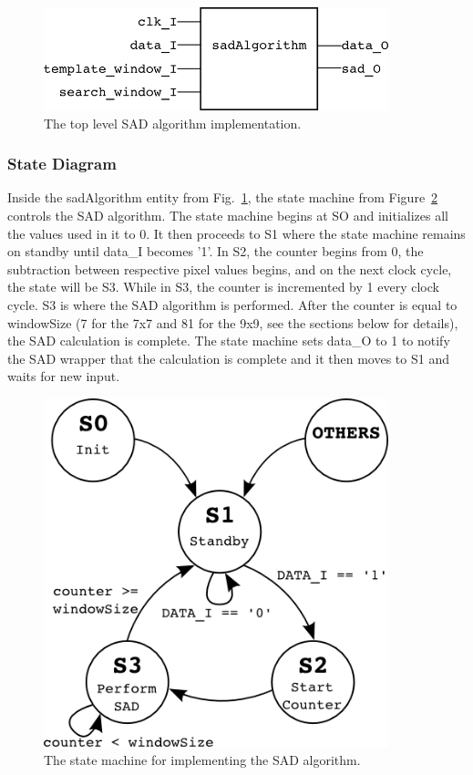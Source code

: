 \begin{figure}[h]
	\begin{center}
		\includegraphics[width=100mm]{figures/sadAlgorithm_rtl.png}
		\captionfonts
		\caption{The top level SAD algorithm implementation.}
		\label{fig:sadAlg_rtl}
	\end{center}
\end{figure}


\subsubsection{State Diagram}

Inside the sadAlgorithm entity from Fig.~\ref{fig:sadAlg_rtl}, the state machine from Figure~\ref{fig:stateMachine} controls the SAD algorithm. The state machine begins at SO and initializes all the values used in it to 0. It then proceeds to S1 where the state machine remains on standby until data\_I becomes '1'. In S2, the counter begins from 0, the subtraction between respective pixel values begins, and on the next clock cycle, the state will be S3. While in S3, the counter is incremented by 1 every clock cycle. S3 is where the SAD algorithm is performed. After the counter is equal to windowSize (7 for the 7x7 and 81 for the 9x9, see the sections below for details), the SAD calculation is complete. The state machine sets data\_O to 1 to notify the SAD wrapper that the calculation is complete and it then moves to S1 and waits for new input.

\begin{figure}[h]
	\begin{center}
		\includegraphics[width=100mm]{figures/stateMachine.png}
		\captionfonts
		\caption{The state machine for implementing the SAD algorithm.}
		\label{fig:stateMachine}
	\end{center}
\end{figure}


